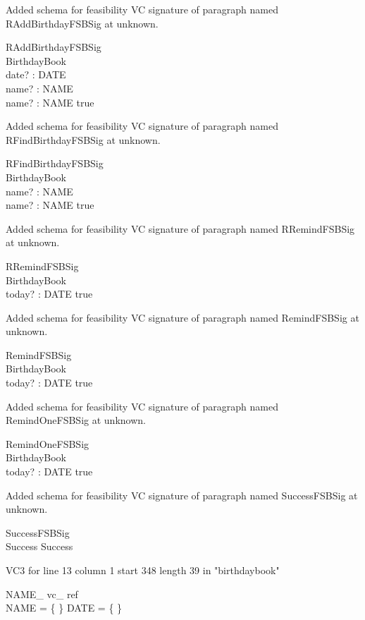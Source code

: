 \documentclass{article}
\begin{document}
Added schema for feasibility VC signature of paragraph named RAddBirthdayFSBSig at unknown.
\begin{schema}{RAddBirthdayFSBSig}
\\
 BirthdayBook \\
 date? : DATE \\
 name? : NAME \\
 name? : NAME 
\where
 true
\end{schema}


Added schema for feasibility VC signature of paragraph named RFindBirthdayFSBSig at unknown.
\begin{schema}{RFindBirthdayFSBSig}
\\
 BirthdayBook \\
 name? : NAME \\
 name? : NAME 
\where
 true
\end{schema}


Added schema for feasibility VC signature of paragraph named RRemindFSBSig at unknown.
\begin{schema}{RRemindFSBSig}
\\
 BirthdayBook \\
 today? : DATE 
\where
 true
\end{schema}


Added schema for feasibility VC signature of paragraph named RemindFSBSig at unknown.
\begin{schema}{RemindFSBSig}
\\
 BirthdayBook \\
 today? : DATE 
\where
 true
\end{schema}


Added schema for feasibility VC signature of paragraph named RemindOneFSBSig at unknown.
\begin{schema}{RemindOneFSBSig}
\\
 BirthdayBook \\
 today? : DATE 
\where
 true
\end{schema}


Added schema for feasibility VC signature of paragraph named SuccessFSBSig at unknown.
\begin{schema}{SuccessFSBSig}
\\
 Success 
\where
 Success
\end{schema}

VC3 for line 13 column 1 start 348 length 39 in "birthdaybook"
\begin{theorem}{ NAME\_ vc\_ ref}\\
 \lnot NAME = \{ \} \land \lnot DATE = \{ \} \\

\end{theorem}
\end{document}
